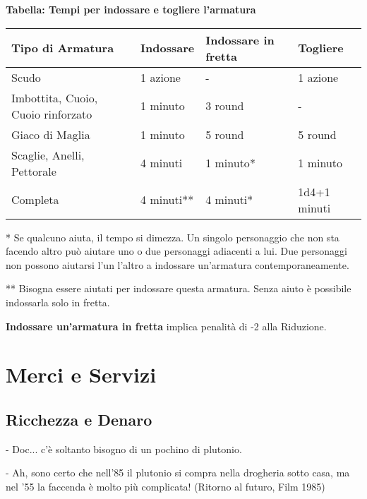 \documentclass[12pt,a4paper,twoside,openany]{book}
\begin{document}
\textbf{Tabella: Tempi per indossare e togliere l'armatura}

\begin{tabular}{llll}
\textbf{Tipo di Armatura}& \textbf{Indossare} & \textbf{Indossare in fretta} & \textbf{Togliere}\\
\toprule
Scudo& 1 azione & - & 1 azione\\
Imbottita, Cuoio, Cuoio rinforzato  & 1 minuto& 3 round  & - \\
Giaco di Maglia& 1 minuto& 5 round  & 5 round\\
Scaglie, Anelli, Pettorale& 4 minuti & 1 minuto{*}  & 1 minuto\\
Completa  & 4 minuti{*}{*}& 4 minuti{*}& 1d4+1 minuti\\
\end{tabular}

\bigskip

\begin{multicols}{2}

{*} Se qualcuno aiuta, il tempo si dimezza. Un singolo personaggio che non sta facendo altro può aiutare uno o due personaggi adiacenti a lui. Due personaggi non possono aiutarsi l'un l'altro a indossare un'armatura contemporaneamente.

{*}{*} Bisogna essere aiutati per indossare questa armatura. Senza aiuto è possibile indossarla solo in fretta.

\textbf{Indossare un'armatura in fretta} implica penalità di -2 alla Riduzione.


\end{multicols}




\section{Merci e Servizi}


\subsection{Ricchezza e Denaro}


\begin{changemargin}{0.3cm}{0.3cm}\begin{enfasi}{
- Doc... c'è soltanto bisogno di un pochino di plutonio.

\medskip

- Ah, sono certo che nell'85 il plutonio si compra nella drogheria sotto casa, ma nel '55 la faccenda è molto più complicata! (Ritorno al futuro, Film 1985)}
\end{enfasi}\end{changemargin}\medskip
\end{document}

